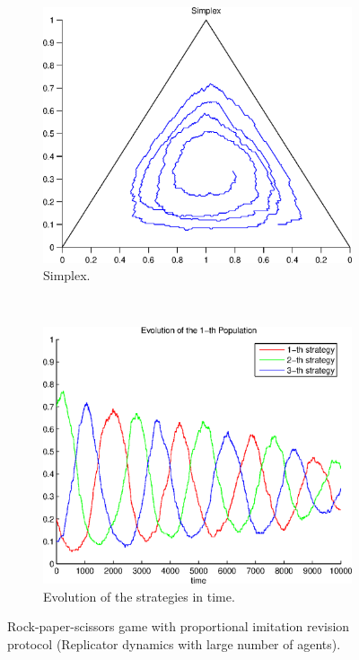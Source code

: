 \begin{figure}
  \centering
  \begin{subfigure}[b]{0.45\textwidth}
	  \includegraphics[width=\textwidth]{./images/test_finite_proportional_imitation.eps}
	  \caption{Simplex.}
	  \label{fig:finite1_simplex}
  \end{subfigure}
  ~ 
  \begin{subfigure}[b]{0.45\textwidth}
	  \includegraphics[width=\textwidth]{./images/test_finite_proportional_imitation_ev.eps}
	  \caption{Evolution of the strategies in time.}
	  \label{fig:finite1_ev}
  \end{subfigure}
  \caption{Rock-paper-scissors game with proportional imitation revision protocol (Replicator dynamics with large number of agents).}
  \label{fig:finite1}
\end{figure}


